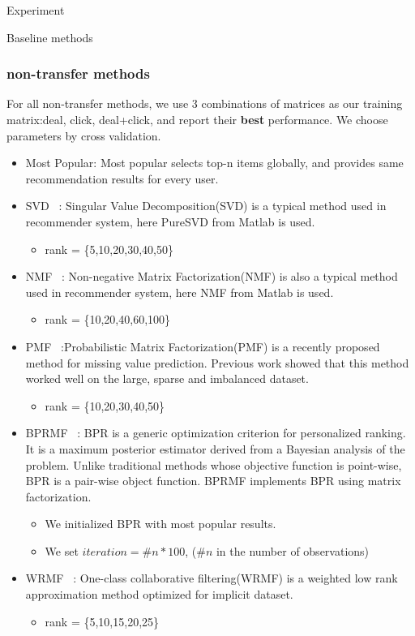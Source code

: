 \begin{section}{Experiment}
\begin{subsection}{Baseline methods}
\subsubsection{non-transfer methods}
\par{
  For all non-transfer methods, we use 3 combinations of matrices as our training matrix:{deal, click, deal+click}, and report their \textbf{best} performance. We choose parameters by cross validation.
  \begin{itemize}
    \item Most Popular: Most popular selects top-n items globally, and provides same recommendation results for every user.
    \item SVD ~\cite{paterek07}: Singular Value Decomposition(SVD) is a typical method used in recommender system, here PureSVD from Matlab is used.
      \begin{itemize}
      \item rank = \{5,10,20,30,40,50\}
      \end{itemize}
    \item NMF ~\cite{/computer/yehuda09matrix}: Non-negative Matrix Factorization(NMF) is also a typical method used in recommender system, here NMF from Matlab is used.
      \begin{itemize}
      \item rank = \{10,20,40,60,100\}
      \end{itemize}
    \item PMF ~\cite{/nips/SalMnih08}:Probabilistic Matrix Factorization(PMF) is a recently proposed method for missing value prediction. Previous work showed that this method worked well on the large, sparse and imbalanced dataset.
      \begin{itemize}
      \item rank = \{10,20,30,40,50\}
      \end{itemize}
    \item BPRMF ~\cite{Rendle:2009:BBP:1795114.1795167}: BPR is a generic optimization criterion for personalized ranking. It is a maximum posterior estimator derived from a Bayesian analysis of the problem. Unlike traditional methods whose objective function is point-wise, BPR is a pair-wise object function. BPRMF implements BPR using matrix factorization.
      \begin{itemize}
      \item We initialized BPR with most popular results.
      \item We set $iteration = \#n * 100$, ($\#n$ in the number of observations)
      \end{itemize}
    \item WRMF ~\cite{4781145}: One-class collaborative filtering(WRMF) is a weighted low rank approximation method optimized for implicit dataset. 
      \begin{itemize}
      \item rank = \{5,10,15,20,25\}
    \end{itemize}
\end{itemize}
}
\end{subsection}
\end{section}
